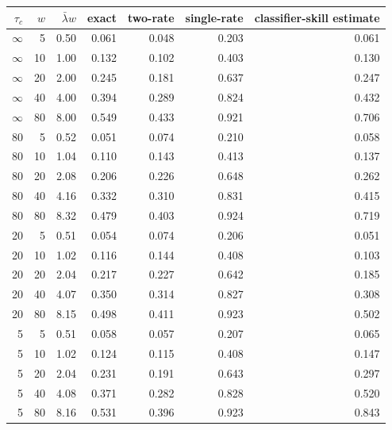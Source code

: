 \begin{tabular}{rrrrrrr}\toprule $\tau_c$ & $w$ & $\bar\lambda w$ & exact & two-rate & single-rate & classifier-skill estimate\\\midrule
$\infty$ & 5 & 0.50 & 0.061 & 0.048 & 0.203 & 0.061\\
$\infty$ & 10 & 1.00 & 0.132 & 0.102 & 0.403 & 0.130\\
$\infty$ & 20 & 2.00 & 0.245 & 0.181 & 0.637 & 0.247\\
$\infty$ & 40 & 4.00 & 0.394 & 0.289 & 0.824 & 0.432\\
$\infty$ & 80 & 8.00 & 0.549 & 0.433 & 0.921 & 0.706\\
80 & 5 & 0.52 & 0.051 & 0.074 & 0.210 & 0.058\\
80 & 10 & 1.04 & 0.110 & 0.143 & 0.413 & 0.137\\
80 & 20 & 2.08 & 0.206 & 0.226 & 0.648 & 0.262\\
80 & 40 & 4.16 & 0.332 & 0.310 & 0.831 & 0.415\\
80 & 80 & 8.32 & 0.479 & 0.403 & 0.924 & 0.719\\
20 & 5 & 0.51 & 0.054 & 0.074 & 0.206 & 0.051\\
20 & 10 & 1.02 & 0.116 & 0.144 & 0.408 & 0.103\\
20 & 20 & 2.04 & 0.217 & 0.227 & 0.642 & 0.185\\
20 & 40 & 4.07 & 0.350 & 0.314 & 0.827 & 0.308\\
20 & 80 & 8.15 & 0.498 & 0.411 & 0.923 & 0.502\\
5 & 5 & 0.51 & 0.058 & 0.057 & 0.207 & 0.065\\
5 & 10 & 1.02 & 0.124 & 0.115 & 0.408 & 0.147\\
5 & 20 & 2.04 & 0.231 & 0.191 & 0.643 & 0.297\\
5 & 40 & 4.08 & 0.371 & 0.282 & 0.828 & 0.520\\
5 & 80 & 8.16 & 0.531 & 0.396 & 0.923 & 0.843\\
\bottomrule\end{tabular}
